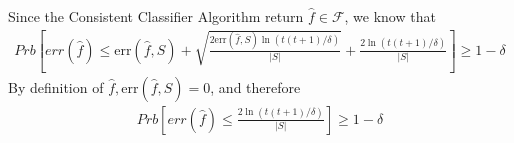 \documentclass[twoside,11pt]{homework}
\begin{document}
Since the Consistent Classifier Algorithm return $\hat{f} \in \mathcal{F} $, we know that\\
\begin{align*}
Prb[err(\hat{f}) \leq \mbox{err}(\hat{f},S) + \sqrt{\frac{2\mbox{err}(\hat{f},S)\ln(t(t+1)/\delta)}{|S|}} + \frac{2\ln(t(t+1)/\delta)}{|S|} ] \geq 1 - \delta
\end{align*}
By definition of $\hat{f}, \mbox{err}(\hat{f},S) = 0$, and therefore\\
\begin{align*}
Prb[err(\hat{f}) \leq \frac{2\ln(t(t+1)/\delta)}{|S|} ] \geq 1 - \delta
\end{align*}
\end{document}

